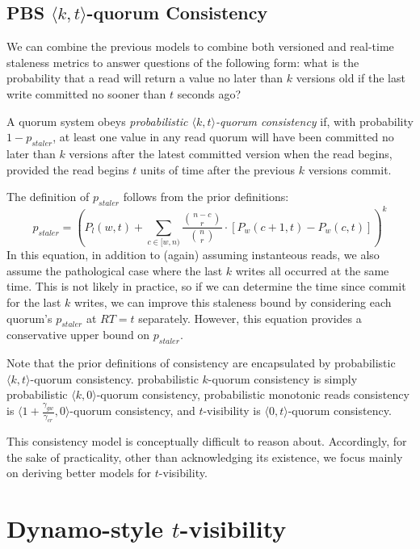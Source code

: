 \documentclass{vldb}
\begin{document}
\subsection{PBS $\langle k, t
  \rangle$-quorum Consistency}

We can combine the previous models to combine both versioned and
real-time staleness metrics to answer questions of the following form:
what is the probability that a read will return a value no later than
$k$ versions old if the last write committed no sooner than $t$ seconds
ago?
\begin{definition}
A quorum system obeys \textit{probabilistic $\langle k, t
  \rangle$-quorum consistency} if, with probability $1-p_{staler}$, at
least one value in any read quorum will have been committed no later
than $k$ versions after the latest committed version when the read
begins, provided the read begins $t$ units of time after the previous
$k$ versions commit.
\end{definition}
The definition of $p_{staler}$ follows from the prior definitions:
\begin{equation}
p_{staler} = (P_l(w, t)+\sum_{c\in[w, n)} \frac{{n-c \choose r}}{{n \choose r}} \cdot [P_w(c+1, t)-P_w(c,t)])^k
\end{equation}
In this equation, in addition to (again) assuming instanteous reads,
we also assume the pathological case where the last $k$ writes all
occurred at the same time.  This is not likely in practice, so if we
can determine the time since commit for the last $k$ writes, we can
improve this staleness bound by considering each quorum's $p_{staler}$
at $RT=t$ separately.  However, this equation provides a conservative
upper bound on $p_{staler}$.

Note that the prior definitions of consistency are encapsulated by
probabilistic $\langle k, t \rangle$-quorum consistency. probabilistic
$k$-quorum consistency is simply probabilistic $\langle k, 0
\rangle$-quorum consistency, probabilistic monotonic reads consistency
is $\langle 1+\frac{\gamma_{gw}}{\gamma_{cr}}, 0 \rangle$-quorum
consistency, and $t$-visibility is $\langle 0, t \rangle$-quorum
consistency.

This consistency model is conceptually difficult to reason about.
Accordingly, for the sake of practicality, other than acknowledging
its existence, we focus mainly on deriving better models for
$t$-visibility.

\section{Dynamo-style $t$-visibility}
\label{sec:dynamo}
\end{document}
